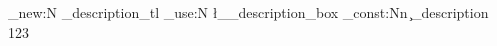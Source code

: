 \tl_new:N
  \g_description_tl  %
\box_use:N
  \l__description_box  %
\int_const:Nn
  \c_description  %
  { 123 }
